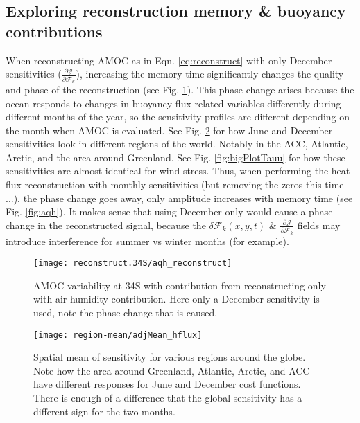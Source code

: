 \documentclass[a4paper,11pt]{article}
\newcommand{\pderiv}[3][]{%
  \ensuremath{\frac{\partial^{#1} {#2}}{\partial {#3}^{#1}}}}
\begin{document}
  \subsection{Exploring reconstruction memory \& buoyancy contributions}

  When reconstructing AMOC as in Eqn. \ref{eq:reconstruct} with only December sensitivities ($\pderiv{\mathcal{J}}{\mathcal{F}_k}$), increasing the memory time significantly changes the quality and phase of the reconstruction (see Fig. \ref{fig:phaseChangeAqh}). This phase change arises because the ocean responds to changes in buoyancy flux related variables differently during different months of the year, so the sensitivity profiles are different depending on the month when AMOC is evaluated. See Fig. \ref{fig:bigPlotHflux} for how June and December sensitivities look in different regions of the world. Notably in the ACC, Atlantic, Arctic, and the area around Greenland. See Fig. \ref{fig:bigPlotTauu} for how these sensitivities are almost identical for wind stress. Thus, when performing the heat flux reconstruction with monthly sensitivities (but removing the zeros this time ...), the phase change goes away, only amplitude increases with memory time (see Fig. \ref{fig:aqh}). It makes sense that using December only would cause a phase change in the reconstructed signal, because the $\delta\mathcal{F}_k(x,y,t)$ \& $\pderiv{\mathcal{J}}{\mathcal{F}_k}$ fields may introduce interference for summer vs winter months (for example).

  
   \begin{figure}
    \centering
    \texttt{[image: reconstruct.34S/aqh\_reconstruct]}
    \caption{AMOC variability at 34S with contribution from reconstructing only with air humidity contribution. Here only a December sensitivity is used, note the phase change that is caused.} 
    \label{fig:phaseChangeAqh}
   \end{figure}

   \begin{figure}
    \centering
    \texttt{[image: region-mean/adjMean\_hflux]}
    \caption{Spatial mean of sensitivity for various regions around the globe. Note how the area around Greenland, Atlantic, Arctic, and ACC have different responses for June and December cost functions. There is enough of a difference that the global sensitivity has a different sign for the two months.}
    \label{fig:bigPlotHflux}
   \end{figure}
\end{document}
